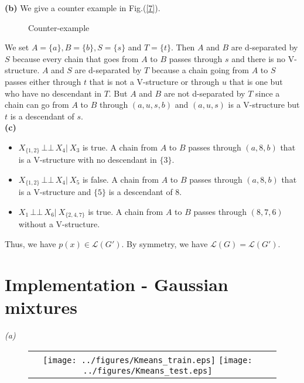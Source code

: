 \documentclass[10pt]{article}
\newcommand{\indep}{\ensuremath{\,\bot\!\!\!\bot\,}} %
\begin{document}
\textbf{(b) }We give a counter example in Fig.(\ref{7}). 
\begin{figure}[h!]
\centering
{}
\caption{Counter-example}
\label{fig7}
\end{figure}
We set $A=\{a\}, B=\{b\}, S=\{s\}$ and $T=\{t\}$. Then $A$ and $B$ are d-separated by $S$ because every chain that goes from $A$ to $B$ passes through $s$ and there is no V-structure. $A$ and $S$ are d-separated by $T$ because a chain going from $A$ to $S$ passes either through $t$ that is not a V-structure or through $u$ that is one but who have no descendant in $T$. But $A$ and $B$ are not d-separated by $T$ since a chain can go from $A$ to $B$ through $(a,u,s,b)$ and $(a,u,s)$ is a V-structure but $t$ is a descendant of $s$.\\





\textbf{(c) }
\begin{itemize}
\item $X_{\{1,2\}} \indep X_4 |\ X_3$ is true. A chain from $A$ to $B$ passes through $(a,8,b)$ that is a V-structure with no descendant in $\{3\}$.

\item $X_{\{1,2\}} \indep X_4 |\ X_5$ is false. A chain from $A$ to $B$ passes through $(a,8,b)$ that is a V-structure and $\{5\}$ is a descendant of 8.

\item $X_1 \indep X_6 |\ X_{\{ 2,4,7 \}}$ is true. A chain from $A$ to $B$ passes through $(8,7,6)$ without a V-structure.
\end{itemize}



Thus, we have $p(x) \in \mathcal{L}(G')$. By symmetry, we have $\mathcal{L}(G) = \mathcal{L}(G')$.


\section{Implementation - Gaussian mixtures\\}

\emph{(a)}

\begin{figure}
\begin{tabular}{c c}
\texttt{[image: ../figures/Kmeans\_train.eps]}
\texttt{[image: ../figures/Kmeans\_test.eps]}
\end{tabular}
\end{figure}
\end{document}
